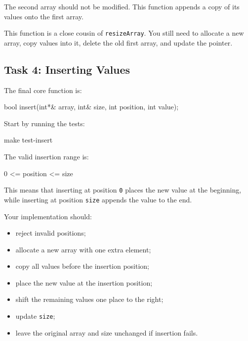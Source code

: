 \documentclass{csc2059practical}
\begin{document}
\begin{commonerror}
The second array should not be modified. This function appends a copy of its values onto the first array.
\end{commonerror}

\begin{tipbox}
This function is a close cousin of \texttt{resizeArray}. You still need to allocate a new array, copy values into it, delete the old first array, and update the pointer.
\end{tipbox}

\subsection{Task 4: Inserting Values}

The final core function is:

\begin{cppcode}
bool insert(int*& array,
            int& size,
            int position,
            int value);
\end{cppcode}

Start by running the tests:

\begin{bashcode}
make test-insert
\end{bashcode}

The valid insertion range is:

\begin{terminal}
0 <= position <= size
\end{terminal}

This means that inserting at position \texttt{0} places the new value at the beginning, while inserting at position \texttt{size} appends the value to the end.

Your implementation should:
\begin{itemize}
  \item reject invalid positions;
  \item allocate a new array with one extra element;
  \item copy all values before the insertion position;
  \item place the new value at the insertion position;
  \item shift the remaining values one place to the right;
  \item update \texttt{size};
  \item leave the original array and size unchanged if insertion fails.
\end{itemize}
\end{document}
